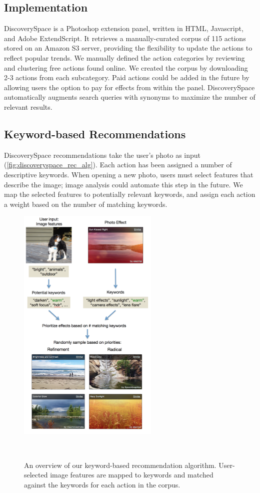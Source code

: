 \subsection{Implementation}
Discovery\-Space is a Photoshop extension panel, written in HTML, Javascript, and Adobe ExtendScript. It retrieves a manually-curated corpus of 115 actions stored on an Amazon S3 server, providing the flexibility to update the actions to reflect popular trends. We manually defined the action categories by reviewing and clustering free actions found online. We created the corpus by downloading 2-3 actions from each subcategory. Paid actions could be added in the future by allowing users the option to pay for effects from within the panel. Discovery\-Space automatically augments search queries with synonyms to maximize the number of relevant results.

\subsection{Keyword-based Recommendations}
Discovery\-Space recommendations take the user's photo as input (\autoref{fig:discoveryspace_rec_alg}). Each action has been assigned a number of descriptive keywords. When opening a new photo, users must select features that describe the image; image analysis could automate this step in the future. We map the selected features to potentially relevant keywords, and assign each action a weight based on the number of matching keywords.

\begin{figure}[b!]
\centering
  \includegraphics[width=0.6\textwidth]{discoveryspace/figures/rec_alg_new.png}
  \caption{An overview of our keyword-based recommendation algorithm. User-selected image features are mapped to keywords and matched against the keywords for each action in the corpus.}~\label{fig:discoveryspace_rec_alg}
\end{figure}

